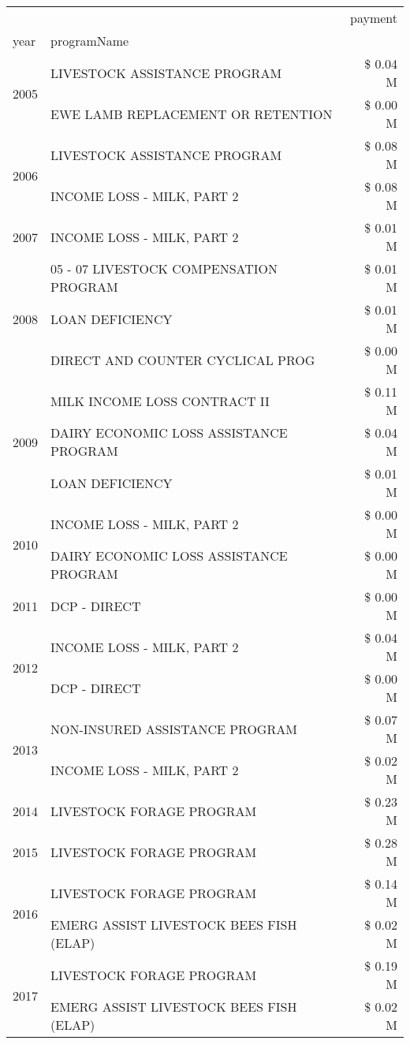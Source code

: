 \begin{tabular}{llr}
\toprule
 &  & payment \\
year & programName &  \\
\midrule
\multirow[t]{2}{*}{2005} & LIVESTOCK ASSISTANCE PROGRAM & \$ 0.04 M \\
 & EWE LAMB REPLACEMENT OR RETENTION & \$ 0.00 M \\
\cline{1-3}
\multirow[t]{2}{*}{2006} & LIVESTOCK ASSISTANCE PROGRAM & \$ 0.08 M \\
 & INCOME LOSS - MILK, PART 2 & \$ 0.08 M \\
\cline{1-3}
2007 & INCOME LOSS - MILK, PART 2 & \$ 0.01 M \\
\cline{1-3}
\multirow[t]{3}{*}{2008} & 05 - 07 LIVESTOCK COMPENSATION PROGRAM & \$ 0.01 M \\
 & LOAN DEFICIENCY & \$ 0.01 M \\
 & DIRECT AND COUNTER CYCLICAL PROG & \$ 0.00 M \\
\cline{1-3}
\multirow[t]{3}{*}{2009} & MILK INCOME LOSS CONTRACT II & \$ 0.11 M \\
 & DAIRY ECONOMIC LOSS ASSISTANCE PROGRAM & \$ 0.04 M \\
 & LOAN DEFICIENCY & \$ 0.01 M \\
\cline{1-3}
\multirow[t]{2}{*}{2010} & INCOME LOSS - MILK, PART 2 & \$ 0.00 M \\
 & DAIRY ECONOMIC LOSS ASSISTANCE PROGRAM & \$ 0.00 M \\
\cline{1-3}
2011 & DCP - DIRECT & \$ 0.00 M \\
\cline{1-3}
\multirow[t]{2}{*}{2012} & INCOME LOSS - MILK, PART 2 & \$ 0.04 M \\
 & DCP - DIRECT & \$ 0.00 M \\
\cline{1-3}
\multirow[t]{2}{*}{2013} & NON-INSURED ASSISTANCE PROGRAM & \$ 0.07 M \\
 & INCOME LOSS - MILK, PART 2 & \$ 0.02 M \\
\cline{1-3}
2014 & LIVESTOCK FORAGE PROGRAM & \$ 0.23 M \\
\cline{1-3}
2015 & LIVESTOCK FORAGE PROGRAM & \$ 0.28 M \\
\cline{1-3}
\multirow[t]{2}{*}{2016} & LIVESTOCK FORAGE PROGRAM & \$ 0.14 M \\
 & EMERG ASSIST LIVESTOCK BEES FISH (ELAP) & \$ 0.02 M \\
\cline{1-3}
\multirow[t]{2}{*}{2017} & LIVESTOCK FORAGE PROGRAM & \$ 0.19 M \\
 & EMERG ASSIST LIVESTOCK BEES FISH (ELAP) & \$ 0.02 M \\

\end{tabular}

